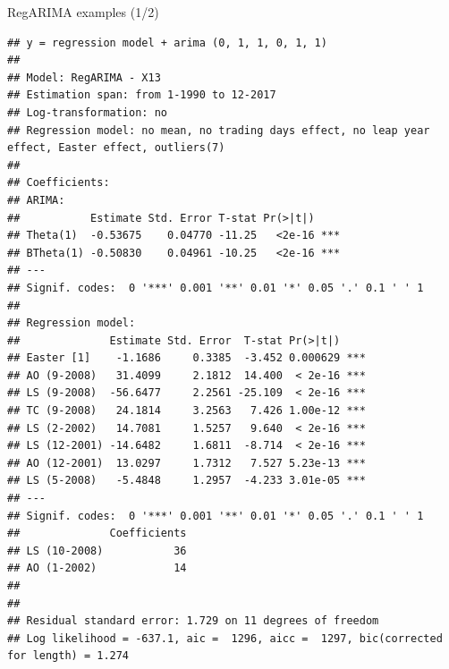 \documentclass[10pt,xcolor=table,color={dvipsnames,usenames},ignorenonframetext,usepdftitle=false,french]{beamer}
\newenvironment{Shaded}{\begin{snugshade}}{\end{snugshade}}
\newcommand{\KeywordTok}[1]{\textcolor[rgb]{0.13,0.29,0.53}{\textbf{#1}}}
\newcommand{\NormalTok}[1]{#1}
\newcommand{\OperatorTok}[1]{\textcolor[rgb]{0.81,0.36,0.00}{\textbf{#1}}}
\begin{document}
\begin{frame}[fragile]{RegARIMA examples (1/2)}
\protect\hypertarget{regarima-examples-12}{}

\footnotesize

\begin{Shaded}
\end{Shaded}

\begin{verbatim}
## y = regression model + arima (0, 1, 1, 0, 1, 1)
## 
## Model: RegARIMA - X13
## Estimation span: from 1-1990 to 12-2017
## Log-transformation: no
## Regression model: no mean, no trading days effect, no leap year effect, Easter effect, outliers(7)
## 
## Coefficients:
## ARIMA: 
##           Estimate Std. Error T-stat Pr(>|t|)    
## Theta(1)  -0.53675    0.04770 -11.25   <2e-16 ***
## BTheta(1) -0.50830    0.04961 -10.25   <2e-16 ***
## ---
## Signif. codes:  0 '***' 0.001 '**' 0.01 '*' 0.05 '.' 0.1 ' ' 1
## 
## Regression model: 
##              Estimate Std. Error  T-stat Pr(>|t|)    
## Easter [1]    -1.1686     0.3385  -3.452 0.000629 ***
## AO (9-2008)   31.4099     2.1812  14.400  < 2e-16 ***
## LS (9-2008)  -56.6477     2.2561 -25.109  < 2e-16 ***
## TC (9-2008)   24.1814     3.2563   7.426 1.00e-12 ***
## LS (2-2002)   14.7081     1.5257   9.640  < 2e-16 ***
## LS (12-2001) -14.6482     1.6811  -8.714  < 2e-16 ***
## AO (12-2001)  13.0297     1.7312   7.527 5.23e-13 ***
## LS (5-2008)   -5.4848     1.2957  -4.233 3.01e-05 ***
## ---
## Signif. codes:  0 '***' 0.001 '**' 0.01 '*' 0.05 '.' 0.1 ' ' 1
##              Coefficients
## LS (10-2008)           36
## AO (1-2002)            14
## 
## 
## Residual standard error: 1.729 on 11 degrees of freedom
## Log likelihood = -637.1, aic =  1296, aicc =  1297, bic(corrected for length) = 1.274
\end{verbatim}

\end{frame}
\end{document}
